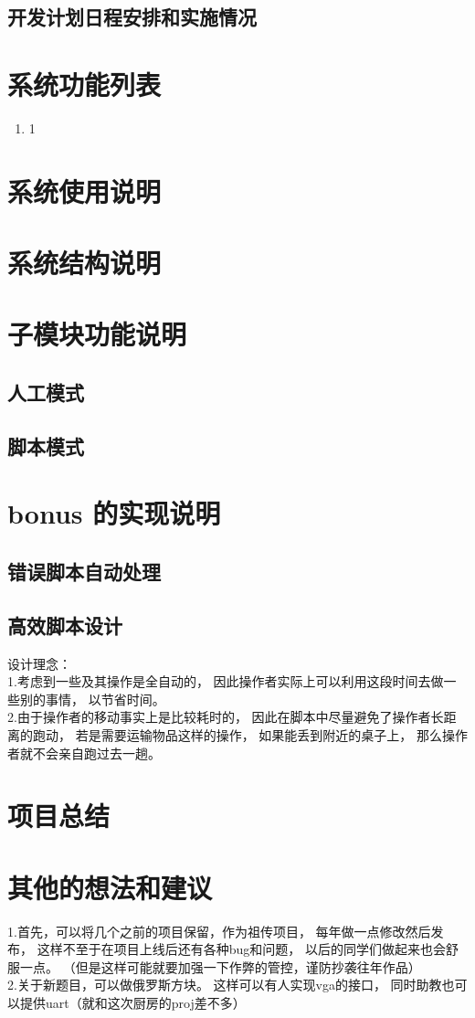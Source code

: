 \documentclass[12pt, a4paper]{ctexart}
\begin{document}
\subsection{开发计划日程安排和实施情况}

\section{系统功能列表}

\begin{enumerate}
	\item 1
\end{enumerate}

\section{系统使用说明}

\section{系统结构说明}

\section{子模块功能说明}
\subsection{人工模式}

\subsection{脚本模式}

\section{bonus 的实现说明}
\subsection{错误脚本自动处理}

\subsection{高效脚本设计}
设计理念：\\
1.考虑到一些及其操作是全自动的，
因此操作者实际上可以利用这段时间去做一些别的事情，
以节省时间。\\
2.由于操作者的移动事实上是比较耗时的，
因此在脚本中尽量避免了操作者长距离的跑动，
若是需要运输物品这样的操作，
如果能丢到附近的桌子上，
那么操作者就不会亲自跑过去一趟。

\section{项目总结}



\section{其他的想法和建议}
1.首先，可以将几个之前的项目保留，作为祖传项目，
每年做一点修改然后发布，
这样不至于在项目上线后还有各种bug和问题，
以后的同学们做起来也会舒服一点。
（但是这样可能就要加强一下作弊的管控，谨防抄袭往年作品）\\
2.关于新题目，可以做俄罗斯方块。
这样可以有人实现vga的接口，
同时助教也可以提供uart（就和这次厨房的proj差不多）
\end{document}
